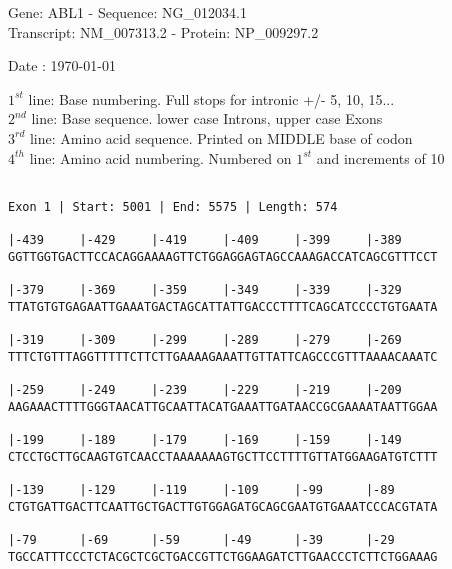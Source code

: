 \documentclass{article}
\begin{document}
\begin{center}
\begin{large}
Gene: ABL1 - Sequence: NG\_012034.1\\
Transcript: NM\_007313.2 - Protein: NP\_009297.2
 
 Date : \today
\end{large}
\end{center}
$1^{st}$ line: Base numbering. Full stops for intronic +/- 5, 10, 15...\\
$2^{nd}$ line: Base sequence. lower case Introns, upper case Exons\\
$3^{rd}$ line: Amino acid sequence. Printed on MIDDLE base of codon\\
$4^{th}$ line: Amino acid numbering. Numbered on $1^{st}$ and increments of 10\\
 \begin{Verbatim}
 
Exon 1 | Start: 5001 | End: 5575 | Length: 574
 
|-439     |-429     |-419     |-409     |-399     |-389     
GGTTGGTGACTTCCACAGGAAAAGTTCTGGAGGAGTAGCCAAAGACCATCAGCGTTTCCT
                                                            
|-379     |-369     |-359     |-349     |-339     |-329     
TTATGTGTGAGAATTGAAATGACTAGCATTATTGACCCTTTTCAGCATCCCCTGTGAATA
                                                            
|-319     |-309     |-299     |-289     |-279     |-269     
TTTCTGTTTAGGTTTTTCTTCTTGAAAAGAAATTGTTATTCAGCCCGTTTAAAACAAATC
                                                            
|-259     |-249     |-239     |-229     |-219     |-209     
AAGAAACTTTTGGGTAACATTGCAATTACATGAAATTGATAACCGCGAAAATAATTGGAA
                                                            
|-199     |-189     |-179     |-169     |-159     |-149     
CTCCTGCTTGCAAGTGTCAACCTAAAAAAAGTGCTTCCTTTTGTTATGGAAGATGTCTTT
                                                            
|-139     |-129     |-119     |-109     |-99      |-89      
CTGTGATTGACTTCAATTGCTGACTTGTGGAGATGCAGCGAATGTGAAATCCCACGTATA
                                                            
|-79      |-69      |-59      |-49      |-39      |-29      
TGCCATTTCCCTCTACGCTCGCTGACCGTTCTGGAAGATCTTGAACCCTCTTCTGGAAAG
                                                            

\end{Verbatim}
\end{document}
